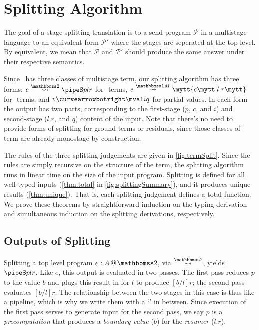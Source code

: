 
\section{Splitting Algorithm}
\label{sec:splitting}



\begin{abstrsyn}

The goal of a stage splitting translation 
is to a send program $\mathcal P$ in a multistage language
to an equivalent form $\mathcal P'$ where the stages are seperated at the top level.
By equivalent, we mean that $\mathcal P$ and $\mathcal P'$ should produce 
the same answer under their respective semantics.

Since \lang\ has three classes of multistage term, 
our splitting algorithm has three forms: 
$\splittwo e A p l r$ for \bbtwo-terms, 
$\splitone e A c {l.r}$ for \bbonem-terms, and 
$v \vsplito \mval i q$ for partial values.
In each form the output has two parts, corresponding to the
first-stage ($p$, $c$, and $i$) and second-stage ($l.r$, and $q$) content of the input.
Note that there's no need to provide forms of splitting for ground terms or residuals,
since those classes of term are already monostage by construction.

The rules of the three splitting judgements are given in \ref{fig:termSplit}.
Since the rules are simply recursive on the structure of the term, 
the splitting algorithm runs in linear time on the size of the input program.
Splitting is defined for all well-typed inputs (\ref{thm:total} in \ref{fig:splittingSummary}), and it produces unique results (\ref{thm:unique}).
That is, each splitting judgement defines a total function.
We prove these theorems by straightforward induction on the typing derivation
and simultaneous induction on the splitting derivations, respectively.

\subsection{Outputs of Splitting}

Splitting a top level program $\coltwo e A$, via $\splittwosym$, yields $\pipeS p l r$.
Like $e$, this output is evaluated in two passes.
The first pass reduces $p$ to the value $b$ and plugs this result in for $l$ to produce $[b/l]r$;
the second pass evaluates $[b/l]r$.
The relationship between the two stages in this case is thus like a pipeline,
which is why we write them with a `\mytt{|}' in between.
Since execution of the first pass serves to generate input for
the second pass, we say $p$ is a {\em precomputation} that produces a
{\em boundary value} ($b$) for the {\em resumer} ($l.r$).


\end{abstrsyn}
